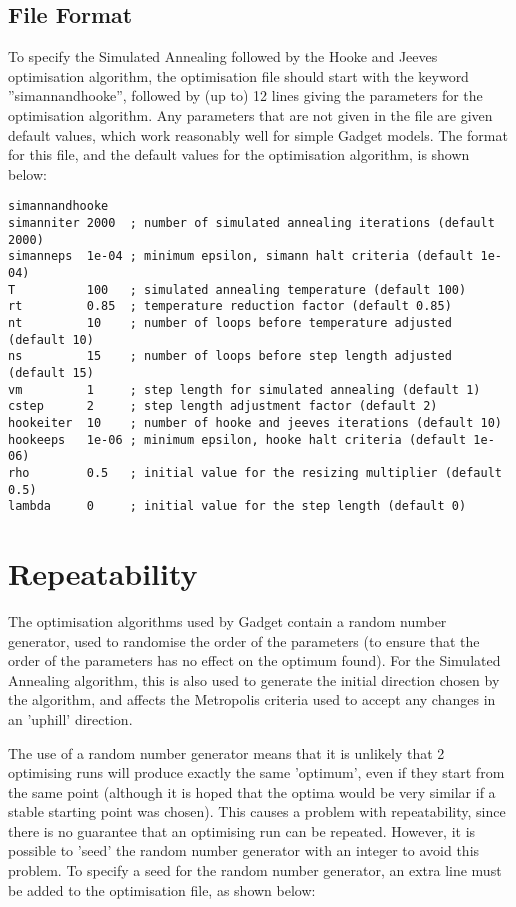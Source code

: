 \documentclass [a4paper, 10pt]{book}
\begin{document}
\subsection{File Format}
To specify the Simulated Annealing followed by the Hooke and Jeeves optimisation algorithm, the optimisation file should start with the keyword ''simannandhooke'', followed by (up to) 12 lines giving the parameters for the optimisation algorithm.  Any parameters that are not given in the file are given default values, which work reasonably well for simple Gadget models.  The format for this file, and the default values for the optimisation algorithm, is shown below:

{\small\begin{verbatim}
simannandhooke
simanniter 2000  ; number of simulated annealing iterations (default 2000)
simanneps  1e-04 ; minimum epsilon, simann halt criteria (default 1e-04)
T          100   ; simulated annealing temperature (default 100)
rt         0.85  ; temperature reduction factor (default 0.85)
nt         10    ; number of loops before temperature adjusted (default 10)
ns         15    ; number of loops before step length adjusted (default 15)
vm         1     ; step length for simulated annealing (default 1)
cstep      2     ; step length adjustment factor (default 2)
hookeiter  10    ; number of hooke and jeeves iterations (default 10)
hookeeps   1e-06 ; minimum epsilon, hooke halt criteria (default 1e-06)
rho        0.5   ; initial value for the resizing multiplier (default 0.5)
lambda     0     ; initial value for the step length (default 0)
\end{verbatim}}

\section{Repeatability}\label{sec:repeat}
The optimisation algorithms used by Gadget contain a random number generator, used to randomise the order of the parameters (to ensure that the order of the parameters has no effect on the optimum found).  For the Simulated Annealing algorithm, this is also used to generate the initial direction chosen by the algorithm, and affects the Metropolis criteria used to accept any changes in an 'uphill' direction.

\bigskip
The use of a random number generator means that it is unlikely that 2 optimising runs will produce exactly the same 'optimum', even if they start from the same point (although it is hoped that the optima would be very similar if a stable starting point was chosen).  This causes a problem with repeatability, since there is no guarantee that an optimising run can be repeated.  However, it is possible to 'seed' the random number generator with an integer to avoid this problem.  To specify a seed for the random number generator, an extra line must be added to the optimisation file, as shown below:
\end{document}
